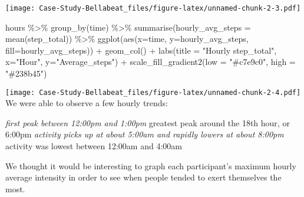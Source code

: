 \documentclass[
]{article}
\newenvironment{Shaded}{\begin{snugshade}}{\end{snugshade}}
\newcommand{\AttributeTok}[1]{\textcolor[rgb]{0.77,0.63,0.00}{#1}}
\newcommand{\FunctionTok}[1]{\textcolor[rgb]{0.00,0.00,0.00}{#1}}
\newcommand{\NormalTok}[1]{#1}
\newcommand{\SpecialCharTok}[1]{\textcolor[rgb]{0.00,0.00,0.00}{#1}}
\newcommand{\StringTok}[1]{\textcolor[rgb]{0.31,0.60,0.02}{#1}}
\begin{document}
\texttt{[image: Case-Study-Bellabeat\_files/figure-latex/unnamed-chunk-2-3.pdf]}

\begin{Shaded}
\begin{Highlighting}[]
\NormalTok{hours }\SpecialCharTok{\%\textgreater{}\%}
  \FunctionTok{group\_by}\NormalTok{(time) }\SpecialCharTok{\%\textgreater{}\%}
  \FunctionTok{summarise}\NormalTok{(}\AttributeTok{hourly\_avg\_steps =} \FunctionTok{mean}\NormalTok{(step\_total)) }\SpecialCharTok{\%\textgreater{}\%}
  \FunctionTok{ggplot}\NormalTok{(}\FunctionTok{aes}\NormalTok{(}\AttributeTok{x=}\NormalTok{time, }\AttributeTok{y=}\NormalTok{hourly\_avg\_steps, }\AttributeTok{fill=}\NormalTok{hourly\_avg\_steps)) }\SpecialCharTok{+} 
  \FunctionTok{geom\_col}\NormalTok{() }\SpecialCharTok{+}
  \FunctionTok{labs}\NormalTok{(}\AttributeTok{title =} \StringTok{"Hourly step\_total"}\NormalTok{, }\AttributeTok{x=}\StringTok{"Hour"}\NormalTok{, }\AttributeTok{y=}\StringTok{"Average\_steps"}\NormalTok{) }\SpecialCharTok{+} 
  \FunctionTok{scale\_fill\_gradient2}\NormalTok{(}\AttributeTok{low =} \StringTok{"\#c7e9c0"}\NormalTok{, }\AttributeTok{high =} \StringTok{"\#238b45"}\NormalTok{)}
\end{Highlighting}
\end{Shaded}

\texttt{[image: Case-Study-Bellabeat\_files/figure-latex/unnamed-chunk-2-4.pdf]}
We were able to observe a few hourly trends:

\emph{first peak between 12:00pm and 1:00pm }greatest peak around the
18th hour, or 6:00pm \emph{activity picks up at about 5:00am and rapidly
lowers at about 8:00pm }activity was lowest between 12:00am and 4:00am

We thought it would be interesting to graph each participant's maximum
hourly average intensity in order to see when people tended to exert
themselves the most.
\end{document}
